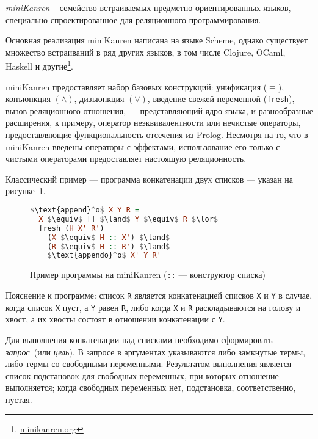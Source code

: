 {\it miniKanren} -- семейство встраиваемых предметно-ориентированных языков,
специально спроектированное для реляционного программирования\cite{byrdMK}.

Основная реализация miniKanren написана на языке Scheme\cite{reasonedSchemer},
однако существует множество встраиваний в ряд других языков, в том числе
Clojure, OCaml, Haskell и другие\footnote{\url{minikanren.org}}.

miniKanren предоставляет набор базовых конструкций: унификация ($\equiv$),
конъюнкция $(\land)$, дизъюнкция $(\lor)$, введение свежей переменной
(\lstinline{fresh}), вызов реляционного отношения,
--- представляющий ядро языка, и разнообразные расширения, к примеру, оператор неэквивалентности
 или нечистые операторы, предоставляющие функциональность
отсечения из Prolog. Несмотря на то, что в miniKanren введены операторы с эффектами, использование
его только с чистыми операторами предоставляет настоящую реляционность.

Классический пример --- программа конкатенации двух списков --- указан
на рисунке~\ref{fig:appendo}.

\begin{figure}[h!]
\begin{lstlisting}[mathescape,language=Haskell,extendedchars=\true,frame=single,basicstyle=\ttfamily]
$\text{append}^o$ X Y R =
  X $\equiv$ [] $\land$ Y $\equiv$ R $\lor$
  fresh (H X' R')
    (X $\equiv$ H :: X') $\land$
    (R $\equiv$ H :: R') $\land$
    $\text{appendo}^o$ X' Y R'
\end{lstlisting}

\caption{Пример программы на miniKanren (\lstinline{::} --- конструктор списка)}
\label{fig:appendo}
\end{figure}

Пояснение к программе:
список \lstinline{R} является конкатенацией списков \lstinline{X} и
\lstinline{Y} в случае, когда список \lstinline{X} пуст, а \lstinline{Y}
равен \lstinline{R}, либо когда \lstinline{X} и \lstinline{R} раскладываются
на голову и хвост, а их хвосты состоят в отношении конкатенации с \lstinline{Y}.

Для выполнения конкатенации над списками необходимо сформировать
\emph{запрос}~(или \emph{цель}).
В запросе в аргументах указываются либо замкнутые термы, либо термы
со свободными переменными. Результатом выполнения является список
подстановок для свободных переменных, при которых отношение выполняется;
когда свободных переменных нет, подстановка, соответственно, пустая.

